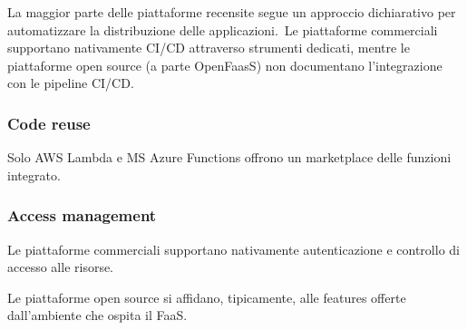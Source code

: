La maggior parte delle piattaforme recensite segue un approccio dichiarativo per automatizzare la distribuzione delle applicazioni.\
Le piattaforme commerciali supportano nativamente CI/CD attraverso strumenti dedicati, mentre le piattaforme open source (a parte OpenFaasS) non documentano l'integrazione con le pipeline CI/CD.

\subsubsection{Code reuse}

Solo AWS Lambda e MS Azure Functions offrono un marketplace delle funzioni integrato.

\subsubsection{Access management}

Le piattaforme commerciali supportano nativamente autenticazione e controllo di accesso alle risorse.\

Le piattaforme open source si affidano, tipicamente, alle features offerte dall'ambiente che ospita il FaaS.
